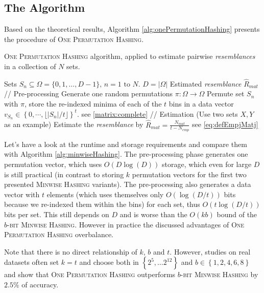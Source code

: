 \documentclass[a4paper]{article}
\begin{document}
\subsection{The Algorithm}

Based on the theoretical results, Algorithm \vref{alg:onePermutationHashing} presents the procedure of \textsc{One Permutation Hashing}.

\begin{algorithm}[H]
\caption{\textsc{One Permutation Hashing} algorithm, applied to estimate pairwise \emph{resemblances} in a collection of $N$ sets.}
\label{alg:onePermutationHashing}
\begin{algorithmic}
\Require Sets $S_n \subseteq \Omega = \{0,1,\ldots,D-1\}, \, n = 1 \text{ to } N$. \Comment $D = \left| \Omega \right|$
\Ensure Estimated \emph{resemblance} $\hat{R}_{mat}$
\State // Pre-processing
\State Generate one random permutations $\pi: \Omega\longrightarrow\Omega$
	\State Permute set $S_n$ with $\pi$, store the re-indexed minima of each of the $t$ bins in a data vector $v_{S_n} \in \left\lbrace 0,\cdots,\lfloor \left| S_n \right| / t \rfloor \right\rbrace ^t$. \Comment see \ref{matrix:complete}
\EndFor
\State
\State // Estimation (Use two sets $X,Y$ as an example)
\State Estimate the \emph{resemblance} by $\hat{R}_{mat}=\frac{N_{mat}}{t-N_{emp}}$ \Comment see \ref{eq:defEmpjMatj}
\end{algorithmic}
\end{algorithm}


Let's have a look at the runtime and storage requirements and compare them with Algorithm \vref{alg:minwiseHashing}. The pre-processing phase generates one permutation vector, which uses $O(D\log(D))$ storage, which even for large $D$ is still practical (in contrast to storing $k$ permutation vectors for the first two presented \textsc{Minwise Hashing} variants). The pre-processing also generates a data vector with $t$ elements (which uses themselves only $O(\log(D/t))$ bits because we re-indexed them within the bins) for each set, thus $O(t \log(D/t))$ bits per set. This still depends on $D$ and is worse than the $O(kb)$ bound of the \textsc{$b$-bit Minwise Hashing}. However in practice the discussed advantages of \textsc{One Permutation Hashing} overbalance.

Note that there is no direct relationship of $k$, $b$ and $t$. However, studies on real datasets often set $k=t$ and choose both in $\left\lbrace 2^5,\ldots 2^{12} \right\rbrace$ and $b \in \left\lbrace 1,2,4,6,8 \right\rbrace$ and show that \textsc{One Permutation Hashing} outperforms \textsc{$b$-bit Minwise Hashing} by $2.5\%$ of accuracy.
\end{document}
